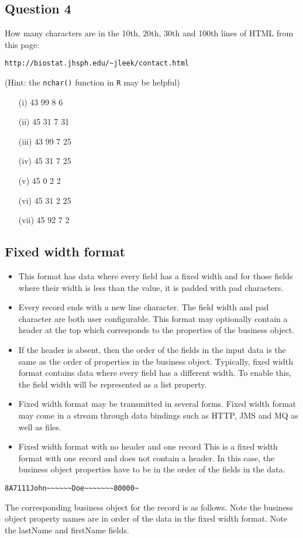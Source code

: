 \documentclass[12pt]{article}
\begin{document}
\subsection*{Question 4}
How many characters are in the 10th, 20th, 30th and 100th lines of HTML from this page: 
\begin{verbatim}
http://biostat.jhsph.edu/~jleek/contact.html 
\end{verbatim}
(Hint: the \texttt{nchar()} function in \texttt{R} may be helpful)
\begin{itemize}
\item[(i)] 43 99 8 6
\item[(ii)] 45 31 7 31
\item[(iii)] 43 99 7 25
\item[(iv)] 45 31 7 25
\item[(v)] 45 0 2 2
\item[(vi)] 45 31 2 25
\item[(vii)] 45 92 7 2
\end{itemize}

\newpage
\subsection*{Fixed width format}

\begin{itemize}
\item This format has data where every field has a fixed width and for those fields where their width is less than the value, it is padded with pad characters. 
\item Every record ends with a new line character. The field width and pad character are both user configurable. This format may optionally contain a header at the top which corresponds to the properties of the business object. 

\item 
If the header is absent, then the order of the fields in the input data is the same as the order of properties in the business object. Typically, fixed width format contains data where every field has a different width. To enable this, the field width will be represented as a list property.
\item 
Fixed width format may be transmitted in several forms. Fixed width format may come in a stream through data bindings such as HTTP, JMS and MQ as well as files.
\item
Fixed width format with no header and one record
This is a fixed width format with one record and does not contain a header. In this case, the business object properties have to be in the order of the fields in the data.
\end{itemize}
\begin{framed}
\begin{verbatim}
8A7111John~~~~~~Doe~~~~~~~80000~
\end{verbatim}
\end{framed}
The corresponding business object for the record is as follows. Note the business object property names are in order of the data in the fixed width format. Note the lastName and firstName fields.
\end{document}
